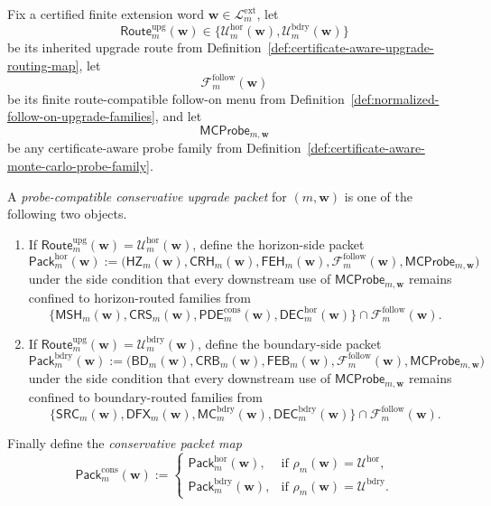 \begin{definition}
\label{def:probe-compatible-conservative-upgrade-packet}
Fix a certified finite extension word \(\mathbf w\in\mathcal L^{\mathrm{ext}}_{m}\), let
\[
  \mathsf{Route}^{\mathrm{upg}}_{m}(\mathbf w)
  \in
  \{\mathcal U^{\mathrm{hor}}_{m}(\mathbf w),\mathcal U^{\mathrm{bdry}}_{m}(\mathbf w)\}
\]
be its inherited upgrade route from Definition~\ref{def:certificate-aware-upgrade-routing-map}, let
\[
  \mathcal F^{\mathrm{follow}}_{m}(\mathbf w)
\]
be its finite route-compatible follow-on menu from Definition~\ref{def:normalized-follow-on-upgrade-families}, and let
\[
  \mathsf{MCProbe}_{m,\mathbf w}
\]
be any certificate-aware probe family from Definition~\ref{def:certificate-aware-monte-carlo-probe-family}.

A \emph{probe-compatible conservative upgrade packet} for \((m,\mathbf w)\) is one of the following two objects.
\begin{enumerate}[label=(\roman*)]
  \item If \(\mathsf{Route}^{\mathrm{upg}}_{m}(\mathbf w)=\mathcal U^{\mathrm{hor}}_{m}(\mathbf w)\), define the horizon-side packet
  \[
    \mathsf{Pack}^{\mathrm{hor}}_{m}(\mathbf w)
    :=
    \bigl(\mathsf{HZ}_{m}(\mathbf w),\mathsf{CRH}_{m}(\mathbf w),\mathsf{FEH}_{m}(\mathbf w),\mathcal F^{\mathrm{follow}}_{m}(\mathbf w),\mathsf{MCProbe}_{m,\mathbf w}\bigr)
  \]
  under the side condition that every downstream use of \(\mathsf{MCProbe}_{m,\mathbf w}\) remains confined to horizon-routed families from
  \[
    \{\mathsf{MSH}_{m}(\mathbf w),\mathsf{CRS}_{m}(\mathbf w),\mathsf{PDE}^{\mathrm{cons}}_{m}(\mathbf w),\mathsf{DEC}^{\mathrm{hor}}_{m}(\mathbf w)\}\cap \mathcal F^{\mathrm{follow}}_{m}(\mathbf w).
  \]
  \item If \(\mathsf{Route}^{\mathrm{upg}}_{m}(\mathbf w)=\mathcal U^{\mathrm{bdry}}_{m}(\mathbf w)\), define the boundary-side packet
  \[
    \mathsf{Pack}^{\mathrm{bdry}}_{m}(\mathbf w)
    :=
    \bigl(\mathsf{BD}_{m}(\mathbf w),\mathsf{CRB}_{m}(\mathbf w),\mathsf{FEB}_{m}(\mathbf w),\mathcal F^{\mathrm{follow}}_{m}(\mathbf w),\mathsf{MCProbe}_{m,\mathbf w}\bigr)
  \]
  under the side condition that every downstream use of \(\mathsf{MCProbe}_{m,\mathbf w}\) remains confined to boundary-routed families from
  \[
    \{\mathsf{SRC}_{m}(\mathbf w),\mathsf{DFX}_{m}(\mathbf w),\mathsf{MC}^{\mathrm{bdry}}_{m}(\mathbf w),\mathsf{DEC}^{\mathrm{bdry}}_{m}(\mathbf w)\}\cap \mathcal F^{\mathrm{follow}}_{m}(\mathbf w).
  \]
\end{enumerate}
Finally define the \emph{conservative packet map}
\[
  \mathsf{Pack}^{\mathrm{cons}}_{m}(\mathbf w)
  :=
  \begin{cases}
    \mathsf{Pack}^{\mathrm{hor}}_{m}(\mathbf w), & \text{if }\rho_m(\mathbf w)=\mathcal U^{\mathrm{hor}},\\[2mm]
    \mathsf{Pack}^{\mathrm{bdry}}_{m}(\mathbf w), & \text{if }\rho_m(\mathbf w)=\mathcal U^{\mathrm{bdry}}.
  \end{cases}
\]
\end{definition}

